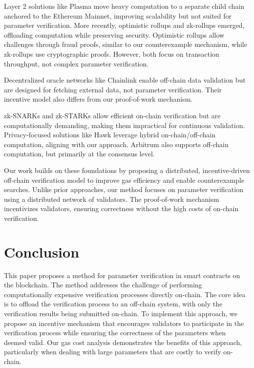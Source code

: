 \documentclass[runningheads]{llncs}
\begin{document}
Layer 2 solutions like Plasma \cite{plasma-whitepaper} move heavy computation to a separate child chain anchored to the Ethereum Mainnet, improving scalability but not suited for parameter verification. More recently, optimistic rollups \cite{optimisticrollups} and zk-rollups \cite{zkrollups} emerged, offloading computation while preserving security. Optimistic rollups allow challenges through fraud proofs, similar to our counterexample mechanism, while zk-rollups use cryptographic proofs. However, both focus on transaction throughput, not complex parameter verification.

Decentralized oracle networks like Chainlink \cite{chainlink} enable off-chain data validation but are designed for fetching external data, not parameter verification. Their incentive model also differs from our proof-of-work mechanism.

zk-SNARKs and zk-STARKs \cite{groth2016snarks} allow efficient on-chain verification but are computationally demanding, making them impractical for continuous validation. Privacy-focused solutions like Hawk \cite{7546538} leverage hybrid on-chain/off-chain computation, aligning with our approach. Arbitrum \cite{10.5555/3277203.3277305} also supports off-chain computation, but primarily at the consensus level.

Our work builds on these foundations by proposing a distributed, incentive-driven off-chain verification model to improve gas efficiency and enable counterexample searches. Unlike prior approaches, our method focuses on parameter verification using a distributed network of validators. The proof-of-work mechanism incentivizes validators, ensuring correctness without the high costs of on-chain verification.
\section{Conclusion}
\label{sec:conclusion}
This paper proposes a method for parameter verification in smart contracts on the blockchain. The method addresses the challenge of performing computationally expensive verification processes directly on-chain. The core idea is to offload the verification process to an off-chain system, with only the verification results being submitted on-chain. To implement this approach, we propose an incentive mechanism that encourages validators to participate in the verification process while ensuring the correctness of the parameters when deemed valid. Our gas cost analysis demonstrates the benefits of this approach, particularly when dealing with large parameters that are costly to verify on-chain.
\newpage


\end{document}
